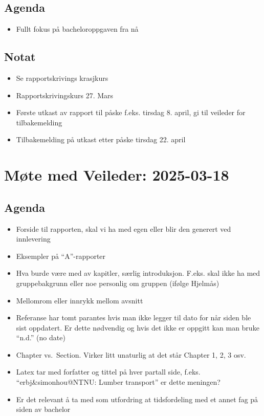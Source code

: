 \subsection*{Agenda}

\begin{itemize}
\item
  Fullt fokus på bacheloroppgaven fra nå
\end{itemize}

\subsection*{Notat}

\begin{itemize}
\item
  Se rapportskrivings krasjkurs
\item
  Rapportskrivingskurs 27. Mars
\item
  Første utkast av rapport til påske f.eks. tirsdag 8. april, gi til
  veileder for tilbakemelding
\item
  Tilbakemelding på utkast etter påske tirsdag 22. april
\end{itemize}

\section*{Møte med Veileder: 2025-03-18}

\subsection*{Agenda}
\begin{itemize}
\item
  Forside til rapporten, skal vi ha med egen eller blir den generert ved
  innlevering
\item
  Eksempler på ``A''-rapporter
\item
  Hva burde være med av kapitler, særlig introduksjon. F.eks. skal ikke
  ha med gruppebakgrunn eller noe personlig om gruppen (ifølge Hjelmås)
\item
  Mellomrom eller innrykk mellom avsnitt
\item
  Referanse har tomt parantes hvis man ikke legger til dato for når
  siden ble sist oppdatert. Er dette nødvendig og hvis det ikke er
  oppgitt kan man bruke ``n.d.'' (no date)
\item
  Chapter vs.~Section. Virker litt unaturlig at det står Chapter 1, 2, 3
  osv.
\item
  Latex tar med forfatter og tittel på hver partall side, f.eks.
  ``erbj\&simonhou@NTNU: Lumber transport'' er dette meningen?
\item
  Er det relevant å ta med som utfordring at tidsfordeling med et annet
  fag på siden av bachelor
\end{itemize}
  
